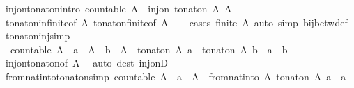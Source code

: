 \begin{isabellebody}
\endisatagproof
{\isafoldproof}%
%
\isadelimproof
\isanewline
%
\endisadelimproof
\isanewline
{}\isamarkupfalse%
\ inj{\isacharunderscore}on{\isacharunderscore}to{\isacharunderscore}nat{\isacharunderscore}on{\isacharbrackleft}intro{\isacharbrackright}{\isacharcolon}\ {\isachardoublequoteopen}countable\ A\ {\isasymLongrightarrow}\ inj{\isacharunderscore}on\ {\isacharparenleft}to{\isacharunderscore}nat{\isacharunderscore}on\ A{\isacharparenright}\ A{\isachardoublequoteclose}\isanewline
%
\isadelimproof
\ \ %
\endisadelimproof
%
\isatagproof
{}\isamarkupfalse%
\ to{\isacharunderscore}nat{\isacharunderscore}on{\isacharunderscore}infinite{\isacharbrackleft}of\ A{\isacharbrackright}\ to{\isacharunderscore}nat{\isacharunderscore}on{\isacharunderscore}finite{\isacharbrackleft}of\ A{\isacharbrackright}\isanewline
\ \ \isamarkupfalse%
\ {\isacharparenleft}cases\ {\isachardoublequoteopen}finite\ A{\isachardoublequoteclose}{\isacharparenright}\ {\isacharparenleft}auto\ simp{\isacharcolon}\ bij{\isacharunderscore}betw{\isacharunderscore}def{\isacharparenright}%
\endisatagproof
{\isafoldproof}%
%
\isadelimproof
\isanewline
%
\endisadelimproof
\isanewline
{}\isamarkupfalse%
\ to{\isacharunderscore}nat{\isacharunderscore}on{\isacharunderscore}inj{\isacharbrackleft}simp{\isacharbrackright}{\isacharcolon}\isanewline
\ \ {\isachardoublequoteopen}countable\ A\ {\isasymLongrightarrow}\ a\ {\isasymin}\ A\ {\isasymLongrightarrow}\ b\ {\isasymin}\ A\ {\isasymLongrightarrow}\ to{\isacharunderscore}nat{\isacharunderscore}on\ A\ a\ {\isacharequal}\ to{\isacharunderscore}nat{\isacharunderscore}on\ A\ b\ {\isasymlongleftrightarrow}\ a\ {\isacharequal}\ b{\isachardoublequoteclose}\isanewline
%
\isadelimproof
\ \ %
\endisadelimproof
%
\isatagproof
{}\isamarkupfalse%
\ inj{\isacharunderscore}on{\isacharunderscore}to{\isacharunderscore}nat{\isacharunderscore}on{\isacharbrackleft}of\ A{\isacharbrackright}\ \isamarkupfalse%
\ {\isacharparenleft}auto\ dest{\isacharcolon}\ inj{\isacharunderscore}onD{\isacharparenright}%
\endisatagproof
{\isafoldproof}%
%
\isadelimproof
\isanewline
%
\endisadelimproof
\isanewline
{}\isamarkupfalse%
\ from{\isacharunderscore}nat{\isacharunderscore}into{\isacharunderscore}to{\isacharunderscore}nat{\isacharunderscore}on{\isacharbrackleft}simp{\isacharbrackright}{\isacharcolon}\ {\isachardoublequoteopen}countable\ A\ {\isasymLongrightarrow}\ a\ {\isasymin}\ A\ {\isasymLongrightarrow}\ from{\isacharunderscore}nat{\isacharunderscore}into\ A\ {\isacharparenleft}to{\isacharunderscore}nat{\isacharunderscore}on\ A\ a{\isacharparenright}\ {\isacharequal}\ a{\isachardoublequoteclose}\isanewline

\end{isabellebody}
